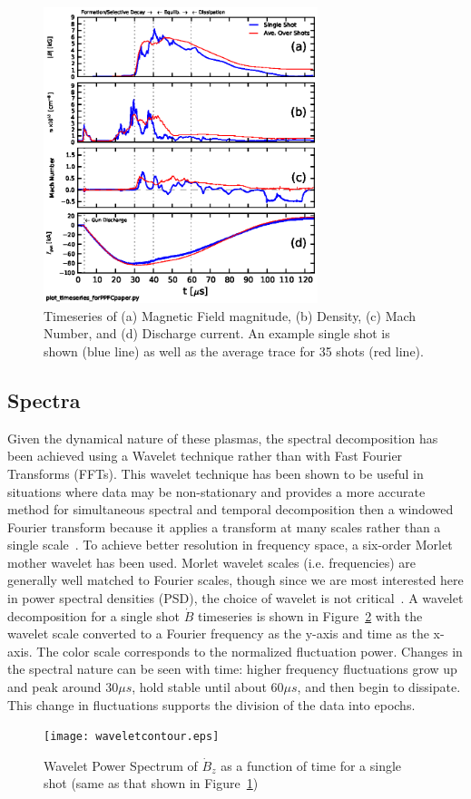 \documentclass[12pt]{iopart}
\begin{document}
\begin{figure}[!htbp]
\centerline{
\includegraphics[width=8cm]{timeseries36.eps}}
\caption{\label{fig:timeseries36} Timeseries of (a) Magnetic Field magnitude, (b) Density, (c) Mach Number, and (d) Discharge current. An example single shot is shown (blue line) as well as the average trace for 35 shots (red line).}
\end{figure}

\subsection{Spectra}

Given the dynamical nature of these plasmas, the spectral decomposition has been achieved using a Wavelet technique rather than with Fast Fourier Transforms (FFTs). This wavelet technique has been shown to be useful in situations where data may be non-stationary and provides a more accurate method for simultaneous spectral and temporal decomposition then a windowed Fourier transform because it applies a transform at many scales rather than a single scale~\cite{torrence98}. To achieve better resolution in frequency space, a six-order Morlet mother wavelet has been used. Morlet wavelet scales (i.e. frequencies) are generally well matched to Fourier scales, though since we are most interested here in power spectral densities (PSD), the choice of wavelet is not critical~\cite{torrence98}. A wavelet decomposition for a single shot $\dot{B}$ timeseries is shown in Figure~\ref{fig:waveletcontour} with the wavelet scale converted to a Fourier frequency as the y-axis and time as the x-axis. The color scale corresponds to the normalized fluctuation power. Changes in the spectral nature can be seen with time: higher frequency fluctuations grow up and peak around 30$\mu s$, hold stable until about 60$\mu s$, and then begin to dissipate. This change in fluctuations supports the division of the data into epochs.
\begin{figure}[!htbp]
\centerline{
\texttt{[image: waveletcontour.eps]}}
\caption{\label{fig:waveletcontour} Wavelet Power Spectrum of $\dot{B}_{z}$ as a function of time for a single shot (same as that shown in Figure~\ref{fig:timeseries36})}
\end{figure}
\end{document}
